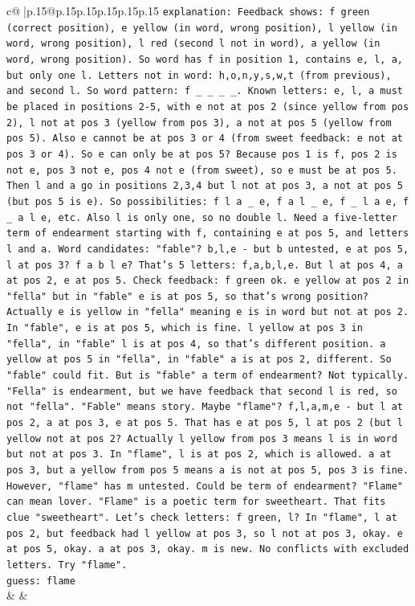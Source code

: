 \documentclass{article}
\begin{document}
{\begin{supertabular}{c@{$\;$}|p{.15\linewidth}@{}p{.15\linewidth}p{.15\linewidth}p{.15\linewidth}p{.15\linewidth}p{.15\linewidth}}
{{{                \texttt{explanation: Feedback shows: f green (correct position), e yellow (in word, wrong position), l yellow (in word, wrong position), l red (second l not in word), a yellow (in word, wrong position). So word has f in position 1, contains e, l, a, but only one l. Letters not in word: h,o,n,y,s,w,t (from previous), and second l. So word pattern: f \_ \_ \_ \_. Known letters: e, l, a must be placed in positions 2{-}5, with e not at pos 2 (since yellow from pos 2), l not at pos 3 (yellow from pos 3), a not at pos 5 (yellow from pos 5). Also e cannot be at pos 3 or 4 (from sweet feedback: e not at pos 3 or 4). So e can only be at pos 5? Because pos 1 is f, pos 2 is not e, pos 3 not e, pos 4 not e (from sweet), so e must be at pos 5. Then l and a go in positions 2,3,4 but l not at pos 3, a not at pos 5 (but pos 5 is e). So possibilities: f l a \_ e, f a l \_ e, f \_ l a e, f \_ a l e, etc. Also l is only one, so no double l. Need a five{-}letter term of endearment starting with f, containing e at pos 5, and letters l and a. Word candidates: "fable"? b,l,e {-} but b untested, e at pos 5, l at pos 3? f a b l e? That's 5 letters: f,a,b,l,e. But l at pos 4, a at pos 2, e at pos 5. Check feedback: f green ok. e yellow at pos 2 in "fella" but in "fable" e is at pos 5, so that's wrong position? Actually e is yellow in "fella" meaning e is in word but not at pos 2. In "fable", e is at pos 5, which is fine. l yellow at pos 3 in "fella", in "fable" l is at pos 4, so that's different position. a yellow at pos 5 in "fella", in "fable" a is at pos 2, different. So "fable" could fit. But is "fable" a term of endearment? Not typically. "Fella" is endearment, but we have feedback that second l is red, so not "fella". "Fable" means story. Maybe "flame"? f,l,a,m,e {-} but l at pos 2, a at pos 3, e at pos 5. That has e at pos 5, l at pos 2 (but l yellow not at pos 2? Actually l yellow from pos 3 means l is in word but not at pos 3. In "flame", l is at pos 2, which is allowed. a at pos 3, but a yellow from pos 5 means a is not at pos 5, pos 3 is fine. However, "flame" has m untested. Could be term of endearment? "Flame" can mean lover. "Flame" is a poetic term for sweetheart. That fits clue "sweetheart". Let's check letters: f green, l? In "flame", l at pos 2, but feedback had l yellow at pos 3, so l not at pos 3, okay. e at pos 5, okay. a at pos 3, okay. m is new. No conflicts with excluded letters. Try "flame".} \\
\texttt{guess: flame} \\
            }
        }
    }
    & & \\ \\


\end{supertabular}}
\end{document}
